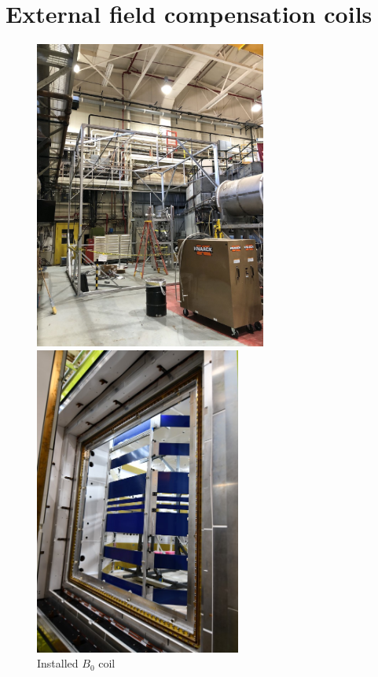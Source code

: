 
\section{External field compensation coils}\label{sec:field-cage}


\begin{figure}
\centering
\begin{minipage}{.5\textwidth}
    \centering
    \includegraphics[height=4in]{figures/field_cage_no_msr.jpg}
    \caption
    {LANL nEDM field cage (Sec.~\ref{sec:field-cage})}
    \label{fig:lanl-field-cage}
\end{minipage}%
\begin{minipage}{.5\textwidth}
    \centering
    \includegraphics[height=4in]{figures/b0_zoom_in.jpg}
    \caption
    {Installed $B_0$ coil}
    \label{fig:lanl-b0-coil}
\end{minipage}
\end{figure}

